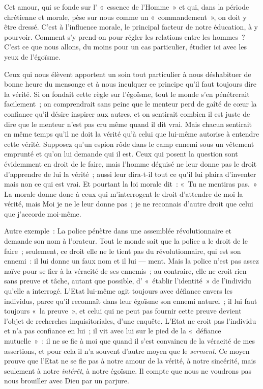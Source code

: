 \documentclass[french,twoside]{book} %
\begin{document}
\noindent Cet amour, qui se fonde sur l’ « essence de l’Homme » et qui, dans la période chrétienne et morale, pèse sur nous comme un « commandement », on doit y être dressé. C’est à l’influence morale, le principal facteur de notre éducation, à y pourvoir. Comment s’y prend-on pour régler les relations entre les hommes ? C’est ce que nous allons, du moins pour un cas particulier, étudier ici avec les yeux de l’égoïsme.\par
Ceux qui nous élèvent apportent un soin tout particulier à nous déshabituer de bonne heure du mensonge et à nous inculquer ce principe qu’il faut toujours dire la vérité. Si on fondait cette règle sur l’égoïsme, tout le monde s’en pénétrerait facilement ; on comprendrait sans peine que le menteur perd de gaîté de cœur la confiance qu’il désire inspirer aux autres, et on sentirait combien il est juste de dire que le menteur n’est pas cru même quand il dit vrai. Mais chacun sentirait en même temps qu’il ne doit la vérité qu’à celui que lui-même autorise à entendre cette vérité. Supposez qu’un espion rôde dans le camp ennemi sous un vêtement emprunté et qu’on lui demande qui il est. Ceux qui posent la question sont évidemment en droit de le faire, mais l’homme déguisé ne leur donne pas le droit d’apprendre de lui la vérité ; aussi leur dira-t-il tout ce qu’il lui plaira d’inventer mais non ce qui est vrai. Et pourtant la  loi morale dit : « Tu ne mentiras pas. » La morale donne donc à ceux qui m’interrogent le droit d’attendre de moi la vérité, mais Moi je ne le leur donne pas ; je ne reconnais d’autre droit que celui que j’accorde moi-même.\par
Autre exemple : La police pénètre dans une assemblée révolutionnaire et demande son nom à l’orateur. Tout le monde sait que la police a le droit de le faire ; seulement, ce droit elle ne le tient pas du révolutionnaire, qui est son ennemi : il lui donne un faux nom et il lui — ment. Mais la police n’est pas assez naïve pour se fier à la véracité de ses ennemis ; au contraire, elle ne croit rien sans preuve et tâche, autant que possible, d’ « établir l’identité » de l’individu qu’elle a interrogé. L’Etat lui-même agit toujours avec défiance envers les individus, parce qu’il reconnaît dans leur égoïsme son ennemi naturel ; il lui faut toujours « la preuve », et celui qui ne peut pas fournir cette preuve devient l’objet de recherches inquisitoriales, d’une enquête. L’Etat ne croit pas l’individu et n’a pas confiance en lui ; il vit avec lui sur le pied de la « défiance mutuelle » : il ne se fie à moi que quand il s’est convaincu de la véracité de mes assertions, et pour cela il n’a souvent d’autre moyen que le \emph{serment}. Ce moyen prouve que l’Etat ne se fie pas à notre amour de la vérité, à notre sincérité, mais seulement à notre \emph{intérêt}, à notre égoïsme. Il compte que nous ne voudrons pas nous brouiller avec Dieu par un parjure.\par
\end{document}
